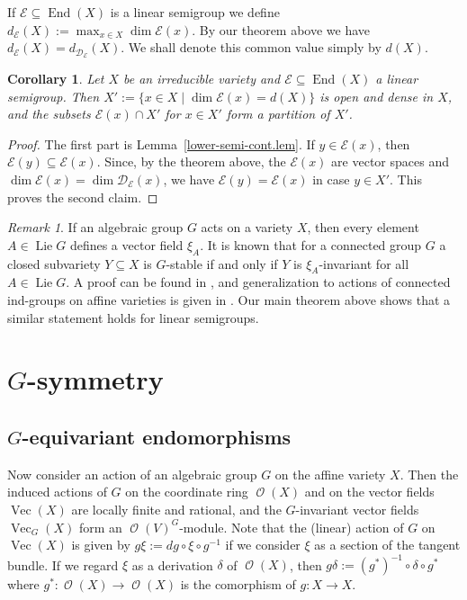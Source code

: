 \documentclass{amsart}
\newtheorem{cor}[thm]{Corollary}
\theoremstyle{definition}
\theoremstyle{remark}
\newtheorem{rem}[thm]{Remark}
\begin{document}
If ${\mathcal E} {\subseteq} \operatorname{End}(X)$ is a linear semigroup we define
$d_{\mathcal E}(X) := \max_{x\in X}\dim{\mathcal E}(x)$. By our theorem above we have $d_{\mathcal E}(X) = d_{{\mathcal D}_{\mathcal E}}(X)$. We shall denote this common value simply by $d(X)$.

\begin{cor}
Let $X$ be an irreducible variety and ${\mathcal E} {\subseteq} \operatorname{End}(X)$ a linear semigroup. Then  $X':=\{x\in X\mid \dim {\mathcal E}(x) = d(X)\}$ is open and dense in $X$, and the subsets ${\mathcal E}(x)\cap X'$ for $x \in X'$ form a partition of $X'$. 
\end{cor}
\begin{proof}
The first part is Lemma~\ref{lower-semi-cont.lem}. If $y \in {\mathcal E}(x)$, then ${\mathcal E}(y){\subseteq} {\mathcal E}(x)$. Since, by the theorem above,  the ${\mathcal E}(x)$ are vector spaces and $\dim {\mathcal E}(x) = \dim {\mathcal D}_{\mathcal E}(x)$, we have ${\mathcal E}(y) = {\mathcal E}(x)$ in case $y \in X'$. This proves the second claim.
\end{proof}

\begin{rem}
If an algebraic group $G$ acts on a variety $X$, then every element $A \in \operatorname{Lie} G$ defines a vector field $\xi_{A}$. It is known that for a connected group $G$ a closed subvariety $Y {\subseteq} X$ is $G$-stable if and only if $Y$ is $\xi_{A}$-invariant for all $A \in \operatorname{Lie} G$. A proof can be found in \cite[III.4.4, Corollary~4.4.7]{Kr2014Algebraic-Transfor}, and generalization to actions of connected ind-groups on affine varieties is given in \cite{FuKr2015On-the-geometry-of}. Our main theorem above shows that a similar statement holds for linear semigroups.
\end{rem}

{\par\medskip}
\section{$G$-symmetry}
\subsection{$G$-equivariant endomorphisms}
Now consider an action of an algebraic group $G$ on the affine variety $X$. Then the induced actions of $G$ on the coordinate ring $\operatorname{\mathcal O}(X)$ and on the vector fields $\operatorname{Vec}(X)$ are locally finite and rational, and the $G$-invariant vector fields ${\operatorname{Vec}_{G}}(X)$ form an $\operatorname{\mathcal O}(V)^{G}$-module. Note that the (linear) action of $G$ on $\operatorname{Vec}(X)$ is given by $g\xi:= dg \circ \xi \circ g^{-1}$ if we consider $\xi$ as a section of the tangent bundle. If we regard $\xi$ as a derivation $\delta$ of $\operatorname{\mathcal O}(X)$, then  $g\delta := (g^{*})^{-1}\circ \delta \circ g^{*}$ where $g^{*}\colon \operatorname{\mathcal O}(X) \to \operatorname{\mathcal O}(X)$ is the comorphism of $g \colon X \to X$.
\end{document}
